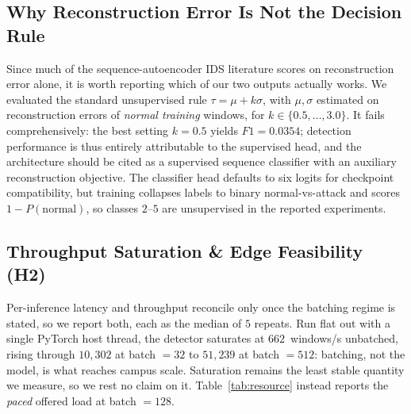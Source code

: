 \documentclass[conference,a4paper]{IEEEtran}
\begin{document}
\begin{table}[htbp]
\caption{Detection Metrics vs. Decision Threshold $\tau$ on Real InSDN}
\label{tab:precision}
\begin{center}
\end{center}
\end{table}

\subsection{Why Reconstruction Error Is Not the Decision Rule}
\label{sec:re_vs_cls}
Since much of the sequence-autoencoder IDS literature scores on reconstruction error alone, it is worth reporting which of our two outputs actually works. We evaluated the standard unsupervised rule $\tau = \mu + k\sigma$, with $\mu, \sigma$ estimated on reconstruction errors of \emph{normal training} windows, for $k \in \{0.5, \ldots, 3.0\}$. It fails comprehensively: the best setting $k=0.5$ yields $F1 = 0.0354$; detection performance is thus entirely attributable to the supervised head, and the architecture should be cited as a supervised sequence classifier with an auxiliary reconstruction objective. The classifier head defaults to six logits for checkpoint compatibility, but training collapses labels to binary normal-vs-attack and scores $1-P(\text{normal})$, so classes $2$--$5$ are unsupervised in the reported experiments.

\subsection{Throughput Saturation \& Edge Feasibility (H2)}
Per-inference latency and throughput reconcile only once the batching regime is stated, so we report both, each as the median of $5$ repeats. Run flat out with a single PyTorch host thread, the detector saturates at $662$~windows/s unbatched, rising through $10{,}302$ at batch $=32$ to $51{,}239$ at batch $=512$: batching, not the model, is what reaches campus scale. Saturation remains the least stable quantity we measure, so we rest no claim on it. Table~\ref{tab:resource} instead reports the \emph{paced} offered load at batch $=128$.
\end{document}
